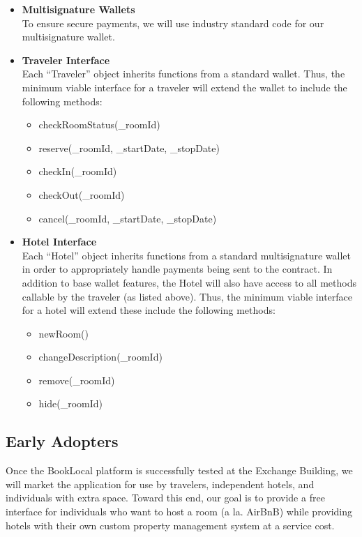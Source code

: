 \documentclass{article}
\begin{document}
\begin{itemize}
\item{\textbf{Multisignature Wallets}} \\
To ensure secure payments, we will use industry standard code for our multisignature wallet. 

\item{\textbf{Traveler Interface}} \\
Each ``Traveler'' object inherits functions from a standard wallet. Thus, the minimum viable interface for a traveler will extend the wallet to include the following methods: 
 \begin{itemize}
  \item checkRoomStatus(\_roomId)
  \item reserve(\_roomId, \_startDate, \_stopDate)
  \item checkIn(\_roomId)
  \item checkOut(\_roomId)
  \item cancel(\_roomId, \_startDate, \_stopDate)
 \end{itemize}
 
\item{\textbf{Hotel Interface}} \\
Each ``Hotel'' object inherits functions from a standard multisignature wallet in order to appropriately handle payments being sent to the contract. In addition to base wallet features, the Hotel will also have access to all methods callable by the traveler (as listed above). Thus, the minimum viable interface for a hotel will extend these include the following methods: 
 \begin{itemize}
  \item newRoom()
  \item changeDescription(\_roomId) 
  \item remove(\_roomId)
  \item hide(\_roomId)
 \end{itemize}
 
\end{itemize}

\subsection{Early Adopters}
Once the BookLocal platform is successfully tested at the Exchange Building, we will market the application for use by travelers, independent hotels, and individuals with extra space. Toward this end, our goal is to provide a free interface for individuals who want to host a room (a la. AirBnB) while providing hotels with their own custom property management system at a service cost. 
\end{document}
